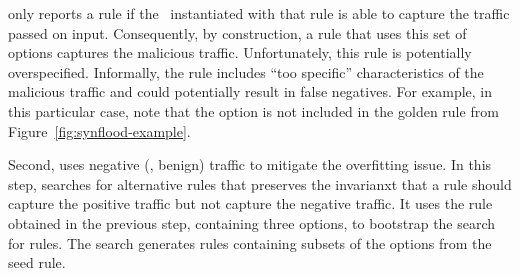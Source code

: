 \documentclass[sigconf,anonymous]{acmart}
\begin{document}

\noindent
\tname{} only reports a rule if the \nids\ instantiated with that rule
is able to capture the traffic passed on input. Consequently, by
construction, a rule that uses this set of options captures the
malicious traffic. Unfortunately, this rule is potentially
overspecified. Informally, the rule includes ``too specific''
characteristics of the malicious traffic and could potentially result
in false negatives. For example, in this particular case, note that
the option  is not included in the golden rule
from Figure~\ref{fig:synflood-example}.

Second, \tname{} uses negative (\ie{}, benign) traffic to mitigate the
overfitting issue. In this step, \tname{} searches for alternative
rules that preserves the invarianxt that a rule should capture the
positive traffic but not capture the negative traffic. It uses the
rule obtained in the previous step, containing three options, to
bootstrap the search for rules. The search generates rules containing
subsets of the options from the seed rule.
\end{document}
